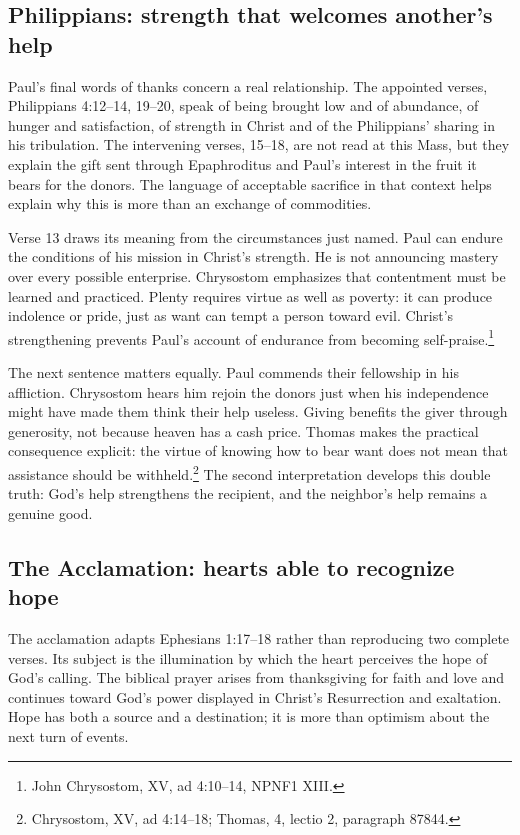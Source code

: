 \subsection{Philippians: strength that welcomes another's help}
Paul's final words of thanks concern a real relationship. The appointed verses, Philippians 4:12--14, 19--20, speak of being brought low and of abundance, of hunger and satisfaction, of strength in Christ and of the Philippians' sharing in his tribulation. The intervening verses, 15--18, are not read at this Mass, but they explain the gift sent through Epaphroditus and Paul's interest in the fruit it bears for the donors. The language of acceptable sacrifice in that context helps explain why this is more than an exchange of commodities.

Verse 13 draws its meaning from the circumstances just named. Paul can endure the conditions of his mission in Christ's strength. He is not announcing mastery over every possible enterprise. Chrysostom emphasizes that contentment must be learned and practiced. Plenty requires virtue as well as poverty: it can produce indolence or pride, just as want can tempt a person toward evil. Christ's strengthening prevents Paul's account of endurance from becoming self-praise.\footnote{John Chrysostom,  XV, ad 4:10--14, NPNF1 XIII.}

The next sentence matters equally. Paul commends their fellowship in his affliction. Chrysostom hears him rejoin the donors just when his independence might have made them think their help useless. Giving benefits the giver through generosity, not because heaven has a cash price. Thomas makes the practical consequence explicit: the virtue of knowing how to bear want does not mean that assistance should be withheld.\footnote{Chrysostom,  XV, ad 4:14--18; Thomas,  4, lectio 2, paragraph 87844.} The second interpretation develops this double truth: God's help strengthens the recipient, and the neighbor's help remains a genuine good.

\subsection{The Acclamation: hearts able to recognize hope}
The acclamation adapts Ephesians 1:17--18 rather than reproducing two complete verses. Its subject is the illumination by which the heart perceives the hope of God's calling. The biblical prayer arises from thanksgiving for faith and love and continues toward God's power displayed in Christ's Resurrection and exaltation. Hope has both a source and a destination; it is more than optimism about the next turn of events.

